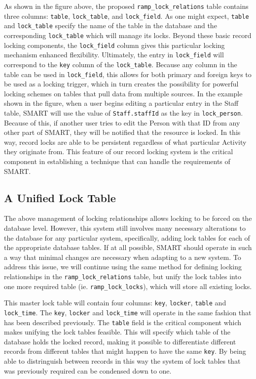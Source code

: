 \documentclass[12pt]{article}
\newcommand{\code}[1]{\texttt{#1}}
\begin{document}
As shown in the figure above, the proposed \code{ramp\_lock\_relations} table contains three columns: \code{table}, \code{lock\_table}, and \code{lock\_field}. As one might expect, \code{table} and \code{lock\_table} specify the name of the table in the database and the corresponding \code{lock\_table} which will manage its locks. Beyond these basic record locking components, the \code{lock\_field} column gives this particular locking mechanism enhanced flexibility. Ultimately, the entry in \code{lock\_field} will correspond to the \code{key} column of the \code{lock\_table}. Because any column in the table can be used in \code{lock\_field}, this allows for both primary and foreign keys to be used as a locking trigger, which in turn creates the possibility for powerful locking schemes on tables that pull data from multiple sources. In the example shown in the figure, when a user begins editing a particular entry in the Staff table, SMART will use the value of \code{Staff.staffId} as the key in \code{lock\_person}. Because of this, if another user tries to edit the Person with that ID from any other part of SMART, they will be notified that the resource is locked. In this way, record locks are able to be persistent regardless of what particular Activity they originate from. This feature of our record locking system is the critical component in establishing a technique that can handle the requirements of SMART.

\subsection{A Unified Lock Table}
The above management of locking relationships allows locking to be forced on the database level. However, this system still involves many necessary alterations to the database for any particular system, specifically, adding lock tables for each of the appropriate database tables. If at all possible, SMART should operate in such a way that minimal changes are necessary when adapting to a new system. To address this issue, we will continue using the same method for defining locking relationships in the \code{ramp\_lock\_relations} table, but unify the lock tables into one more required table (ie. \code{ramp\_lock\_locks}), which will store all existing locks.

This master lock table will contain four columns: \code{key}, \code{locker}, \code{table} and \code{lock\_time}. The \code{key}, \code{locker} and \code{lock\_time} will operate in the same fashion that has been described previously. The \code{table} field is the critical component which makes unifying the lock tables feasible. This will specify which table of the database holds the locked record, making it possible to differentiate different records from different tables that might happen to have the same \code{key}. By being able to distringuish between records in this way the system of lock tables that was previously required can be condensed down to one.
\end{document}

